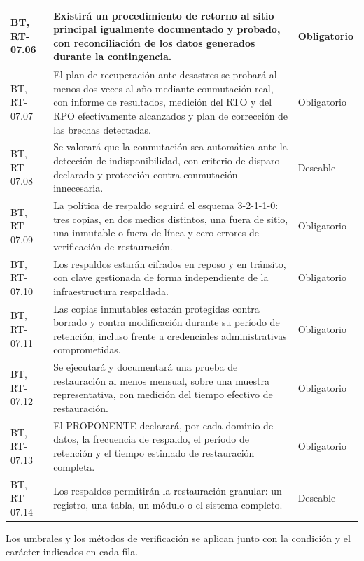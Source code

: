 \begin{longtable}{|L{0.098425\AnchoTablaAnexo}|L{0.814961\AnchoTablaAnexo}|L{0.086614\AnchoTablaAnexo}|}
BT, RT-07.06 &
Existirá un procedimiento de retorno al sitio principal igualmente documentado y probado, con reconciliación de los datos generados durante la contingencia. &
Obligatorio \\ \hline
{}
BT, RT-07.07 &
El plan de recuperación ante desastres se probará al menos dos veces al año mediante conmutación real, con informe de resultados, medición del RTO y del RPO efectivamente alcanzados y plan de corrección de las brechas detectadas. &
Obligatorio \\ \hline
BT, RT-07.08 &
Se valorará que la conmutación sea automática ante la detección de indisponibilidad, con criterio de disparo declarado y protección contra conmutación innecesaria. &
Deseable \\ \hline
{}
BT, RT-07.09 &
La política de respaldo seguirá el esquema 3-2-1-1-0: tres copias, en dos medios distintos, una fuera de sitio, una inmutable o fuera de línea y cero errores de verificación de restauración. &
Obligatorio \\ \hline
BT, RT-07.10 &
Los respaldos estarán cifrados en reposo y en tránsito, con clave gestionada de forma independiente de la infraestructura respaldada. &
Obligatorio \\ \hline
{}
BT, RT-07.11 &
Las copias inmutables estarán protegidas contra borrado y contra modificación durante su período de retención, incluso frente a credenciales administrativas comprometidas. &
Obligatorio \\ \hline
BT, RT-07.12 &
Se ejecutará y documentará una prueba de restauración al menos mensual, sobre una muestra representativa, con medición del tiempo efectivo de restauración. &
Obligatorio \\ \hline
{}
BT, RT-07.13 &
El PROPONENTE declarará, por cada dominio de datos, la frecuencia de respaldo, el período de retención y el tiempo estimado de restauración completa. &
Obligatorio \\ \hline
BT, RT-07.14 &
Los respaldos permitirán la restauración granular: un registro, una tabla, un módulo o el sistema completo. &
Deseable \\ \hline
\end{longtable}

Los umbrales y los métodos de verificación se aplican junto con la condición y el carácter indicados en cada fila.

